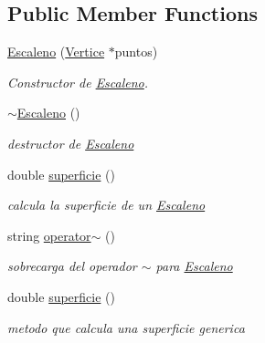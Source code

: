 \subsection*{Public Member Functions}
\begin{DoxyCompactItemize}
\item 
\hyperlink{class_escaleno_a2670875a1c4940661ea68fb97a8e2da1}{Escaleno} (\hyperlink{class_vertice}{Vertice} $\ast$puntos)
\begin{DoxyCompactList}\small\item\em Constructor de \hyperlink{class_escaleno}{Escaleno}. \end{DoxyCompactList}\item 
\mbox{\label{class_escaleno_a49f27943915cf764e133b4ebd24ca060}} 
\hyperlink{class_escaleno_a49f27943915cf764e133b4ebd24ca060}{$\sim$\+Escaleno} ()
\begin{DoxyCompactList}\small\item\em destructor de \hyperlink{class_escaleno}{Escaleno} \end{DoxyCompactList}\item 
\mbox{\label{class_escaleno_a7d71f0f712f7673eca014f1821b78846}} 
double \hyperlink{class_escaleno_a7d71f0f712f7673eca014f1821b78846}{superficie} ()
\begin{DoxyCompactList}\small\item\em calcula la superficie de un \hyperlink{class_escaleno}{Escaleno} \end{DoxyCompactList}\item 
\mbox{\label{class_escaleno_a083472de2f48b2d3da5e11a4d33be38a}} 
string \hyperlink{class_escaleno_a083472de2f48b2d3da5e11a4d33be38a}{operator$\sim$} ()
\begin{DoxyCompactList}\small\item\em sobrecarga del operador $\sim$ para \hyperlink{class_escaleno}{Escaleno} \end{DoxyCompactList}\item 
\mbox{\label{class_escaleno_a7d71f0f712f7673eca014f1821b78846}} 
double \hyperlink{class_escaleno_a7d71f0f712f7673eca014f1821b78846}{superficie} ()
\begin{DoxyCompactList}\small\item\em metodo que calcula una superficie generica \end{DoxyCompactList}\end{DoxyCompactItemize}
